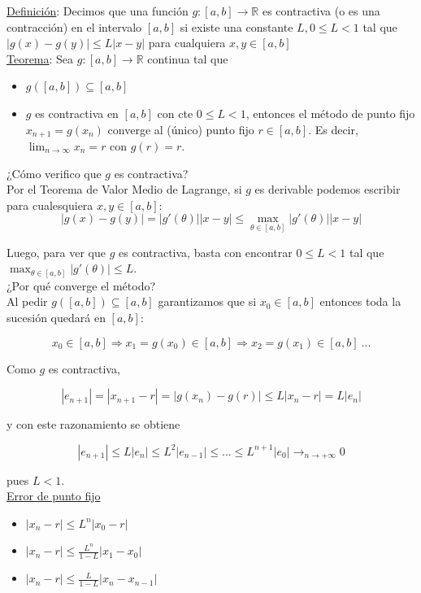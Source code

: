 \underline{Definici\'on}: Decimos que una funci\'on $g: [a, b] \rightarrow \mathbb{R}$ es contractiva (o es una contracci\'on) en el intervalo $[a, b]$ si existe una constante $L, 0 \leq L < 1$ tal que $|g(x) - g(y)| \leq L|x - y|$ para cualquiera $x, y \in [a, b]$\\

\underline{Teorema}: Sea $g: [a, b] \rightarrow \mathbb{R}$ continua tal que

\begin{itemize}
    \item $g([a, b]) \subseteq [a, b]$
    
    \item $g$ es contractiva en $[a, b]$ con cte $0 \leq L < 1$, entonces el m\'etodo de punto fijo $x_{n + 1} = g(x_{n})$ converge al (\'unico) punto fijo $r \in [a, b]$. Es decir, $\lim_{n \to \infty} x_{n} = r$ con $g(r) = r$.
\end{itemize}

¿C\'omo verifico que $g$ es contractiva?\\

Por el Teorema de Valor Medio de Lagrange, si $g$ es derivable podemos escribir para cualesquiera $x, y \in [a, b]$:\\

$$|g(x) - g(y)| = |g'(\theta)||x - y| \leq \max_{\theta \in [a, b]} |g'(\theta)||x - y|$$

Luego, para ver que $g$ es contractiva, basta con encontrar $0 \leq L < 1$ tal que $\max_{\theta \in [a, b]} |g'(\theta)| \leq L$.\\

¿Por qu\'e converge el m\'etodo?\\

Al pedir $g([a, b]) \subseteq [a, b]$ garantizamos que si $x_{0} \in [a, b]$ entonces toda la sucesi\'on quedar\'a en $[a, b]$:

$$x_{0} \in [a, b] \Rightarrow x_{1} = g(x_{0}) \in [a, b] \Rightarrow x_{2} = g(x_{1}) \in [a, b]\ ...$$

Como $g$ es contractiva,

$$|e_{n + 1}| = |x_{n + 1} - r| = |g(x_{n}) - g(r)| \leq L|x_{n} - r| = L|e_{n}|$$

y con este razonamiento se obtiene

$$|e_{n + 1}| \leq L|e_{n}| \leq L^{2}|e_{n - 1}| \leq ... \leq L^{n + 1}|e_{0}| \rightarrow_{n \to +\infty} 0$$

pues $L < 1$.\\

\underline{Error de punto fijo}

\begin{itemize}
    \item $|x_{n} - r| \leq L^{n}|x_{0} - r|$

    \item $|x_{n} - r| \leq \frac{L^{n}}{1 - L}|x_{1} - x_{0}|$

    \item $|x_{n} - r| \leq \frac{L}{1 - L}|x_{n} - x_{n - 1}|$
\end{itemize}